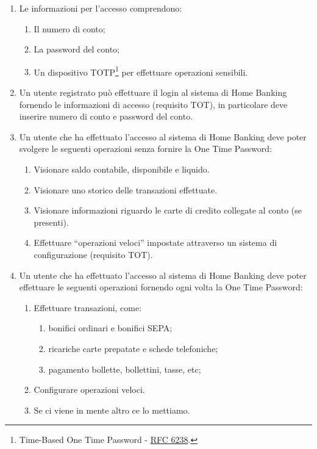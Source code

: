 \documentclass[draft]{softeng}
\begin{document}
\begin{enumerate}
		Un utente non pre-registrato pu\`o effettuare la procedura completa di registrazione presso una filiale, fornendo le stesse informazioni richieste agli utenti che si pre-registrano online.
	\item Le informazioni per l'accesso comprendono:
		\begin{enumerate}
			\item Il numero di conto;
			\item La password del conto;
			\item Un dispositivo TOTP\footnote{Time-Based One Time Password - \href{https://tools.ietf.org/html/rfc6238}{RFC 6238}.} per effettuare operazioni sensibili.
		\end{enumerate}
	\item Un utente registrato pu\`o effettuare il login al sistema di Home Banking fornendo le informazioni di accesso (requisito TOT), in particolare deve inserire numero di conto e password del conto.
	\item Un utente che ha effettuato l'accesso al sistema di Home Banking deve poter svolgere le seguenti operazioni senza fornire la One Time Password:
		\begin{enumerate}
			\item Visionare saldo contabile, disponibile e liquido.
			\item Visionare uno storico delle transazioni effettuate.
			\item Visionare informazioni riguardo le carte di credito collegate al conto (se presenti).
			\item Effettuare ``operazioni veloci'' impostate attraverso un sistema di configurazione (requisito TOT).
		\end{enumerate}
	\item Un utente che ha effettuato l'accesso al sistema di Home Banking deve poter effettuare le seguenti operazioni fornendo ogni volta la One Time Password:
		\begin{enumerate}
			\item Effettuare transazioni, come:
				\begin{enumerate}
					\item bonifici ordinari e bonifici SEPA;
					\item ricariche carte prepatate e schede telefoniche;
					\item pagamento bollette, bollettini, tasse, etc;
				\end{enumerate}
			\item Configurare operazioni veloci.
			\item Se ci viene in mente altro ce lo mettiamo.

\end{enumerate}
\end{enumerate}
\end{document}
